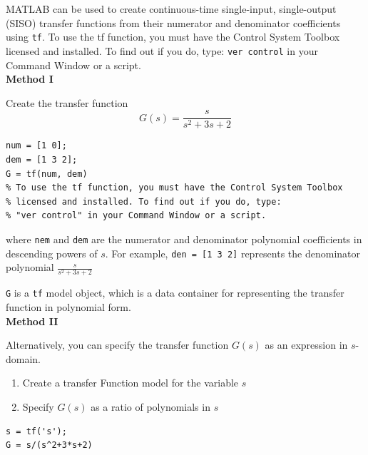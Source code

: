 \documentclass[12pt,letter]{article}
\numberwithin{ex}{section} %
\numberwithin{re}{section} %
\numberwithin{equation}{section}	%
\begin{document}
MATLAB can be used to create continuous-time single-input, single-output (SISO) transfer functions from their numerator and denominator coefficients using \texttt{tf}. To use the tf function, you must have the Control System Toolbox licensed and installed. To find out if you do, type: \texttt{ver control} in your Command Window or a script. \\

\noindent \textbf{Method I}

Create the transfer function 
\begin{equation}
G(s) = \frac{s}{s^2 + 3s + 2}
\end{equation}


\lstset{linewidth=5.8in}
\begin{minipage}{1\textwidth}
  \begin{center}
\begin{lstlisting}
num = [1 0];
dem = [1 3 2];
G = tf(num, dem) 
% To use the tf function, you must have the Control System Toolbox
% licensed and installed. To find out if you do, type: 
% "ver control" in your Command Window or a script.  
\end{lstlisting}
  \end{center}
\end{minipage}
where \texttt{nem} and \texttt{dem} are the numerator and denominator polynomial coefficients in descending powers of $s$. For example, \texttt{den = [1 3 2]} represents the denominator polynomial $\frac{s}{s^2 + 3s + 2}$

\texttt{G} is a \texttt{tf} model object, which is a data container for representing the transfer function in polynomial form. \\


\noindent \textbf{Method II}

Alternatively, you can specify the transfer function $G(s)$ as an expression in $s$-domain.
\begin{enumerate}[noitemsep,topsep=0pt]
\item Create a transfer Function model for the variable $s$
\item Specify $G(s)$ as a ratio of polynomials in $s$
\end{enumerate}

\lstset{linewidth=5.8in}
\begin{minipage}{1\textwidth}
  \begin{center}
\begin{lstlisting}
s = tf('s');
G = s/(s^2+3*s+2)
\end{lstlisting}
  \end{center}
\end{minipage}
\end{document}
